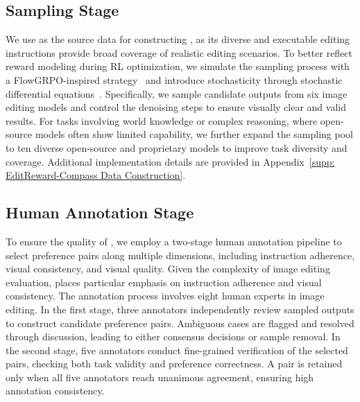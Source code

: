 \subsection{Sampling Stage}
\label{Sampling Stage}
We use {\bench} as the source data for constructing {\rmbench}, as its diverse and executable editing instructions provide broad coverage of realistic editing scenarios. To better reflect reward modeling during RL optimization, we simulate the sampling process with a FlowGRPO-inspired strategy~\cite{liu2025flow} and introduce stochasticity through stochastic differential equations~\cite{song2020score}.
Specifically, we sample candidate outputs from six image editing models and control the denoising steps to ensure visually clear and valid results. For tasks involving world knowledge or complex reasoning, where open-source models often show limited capability, we further expand the sampling pool to ten diverse open-source and proprietary models to improve task diversity and coverage. Additional implementation details are provided in Appendix~\ref{supp: EditReward-Compass Data Construction}.

\subsection{Human Annotation Stage}
\label{Reward Model Benchmark Human Annotation}
To ensure the quality of {\rmbench}, we employ a two-stage human annotation pipeline to select preference pairs along multiple dimensions, including instruction adherence, visual consistency, and visual quality. Given the complexity of image editing evaluation, {\rmbench} places particular emphasis on instruction adherence and visual consistency. The annotation process involves eight human experts in image editing.
In the first stage, three annotators independently review sampled outputs to construct candidate preference pairs. Ambiguous cases are flagged and resolved through discussion, leading to either consensus decisions or sample removal. In the second stage, five annotators conduct fine-grained verification of the selected pairs, checking both task validity and preference correctness. A pair is retained only when all five annotators reach unanimous agreement, ensuring high annotation consistency.

